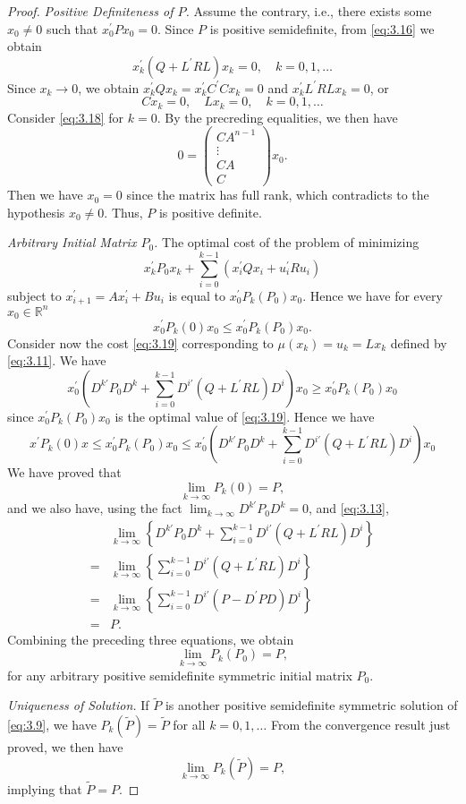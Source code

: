 \begin{proof}
\textit{Positive Definiteness of $P$.} 
Assume the contrary, i.e., there exists some $x_0\neq 0$ such that $x_0^{\prime} P x_0=0$. Since $P$ is positive semidefinite, from \cref{eq:3.16} we obtain \[x_k^\prime (Q + L^\prime R L)x_k = 0,\quad k = 0,1,\dots\]
Since $x_k\rightarrow 0$, we obtain $x_k^\prime Q x_k=x_k^\prime C^\prime C x_k=0$ and $x_k^\prime L^\prime R L x_k=0$, or
\[Cx_k = 0,\quad L x_k = 0,\quad k = 0,1,\dots\]
Consider \cref{eq:3.18} for $k=0$. By the precreding equalities, we then have 
\[0 = \begin{pmatrix}
    CA^{n - 1}\\ 
    \vdots\\ CA \\ C 
\end{pmatrix}x_0.\]
Then we have $x_0=0$ since the matrix has full rank, which contradicts to the hypothesis $x_0\neq 0$. Thus, $P$ is positive definite.

\textit{Arbitrary Initial Matrix $P_0$.} 
The optimal cost of the problem of minimizing
\begin{equation}
    x_k^\prime P_0 x_k + \sum_{i=0}^{k-1} (x_i^{\prime} Q x_i + u_i^{\prime} R u_i)\label{eq:3.19}
\end{equation}
subject to $x_{i+1}^{\prime} =A x_i^{\prime} +B u_i$ is equal to $x_0^{\prime} P_k(P_0)x_0$. Hence we have for every $x_0\in\mathbb{R}^n$
\[x_0^\prime P_k(0)x_0 \leq x_0^\prime P_k(P_0)x_0.\]
Consider now the cost \cref{eq:3.19} corresponding to $\mu(x_k)=u_k=L x_k$ defined by \cref{eq:3.11}. We have 
\[x_0^\prime \left(D^{k\prime}P_0 D^k + \sum_{i=0}^{k-1} D^{i\prime}(Q + L^\prime R L)D^i\right)x_0 \geq x_0^\prime P_k(P_0)x_0\]
since $x_0^\prime P_k(P_0)x_0$ is the optimal value of \cref{eq:3.19}.
Hence we have 
\[x^\prime P_k(0)x 
\leq x_0^\prime P_k(P_0)x_0 
\leq x_0^\prime \left(D^{k\prime}P_0 D^k + \sum_{i=0}^{k-1} D^{i\prime}(Q +
L^\prime R L)D^i\right)x_0 \]
We have proved that 
\[\lim_{k\rightarrow\infty} P_k(0) = P,\]
and we also have, using the fact $\lim_{k\rightarrow\infty} D^{k\prime}P_0 D^k=0$, and \cref{eq:3.13},
\begin{equation}
    \begin{aligned}
        &\lim_{k\rightarrow\infty} \left\{ D^{k\prime}P_0
        D^k + \sum_{i=0}^{k-1} D^{i\prime}(Q + L^\prime R L)D^i\right\}\\
        =&\lim_{k\rightarrow\infty} \left\{\sum_{i=0}^{k-1} D^{i\prime}(Q + L^\prime RL)D^i\right\}\\
        =&\lim_{k\rightarrow\infty} \left\{\sum_{i=0}^{k-1} D^{i\prime}(P - D^\prime PD)D^i\right\}\\
        =&P.
    \end{aligned}
\end{equation}
Combining the preceding three equations, we obtain
\[\lim_{k\rightarrow\infty} P_k(P_0) = P,\]
for any arbitrary positive semidefinite symmetric initial matrix $P_0$.

\textit{Uniqueness of Solution.}
If $\tilde{P}$ is another positive semidefinite symmetric solution of \cref{eq:3.9}, we have $P_k(\tilde{P})=\tilde{P}$ for all $k=0,1,\dots$ From the convergence result just proved, we then have \[\lim_{k\rightarrow\infty} P_k(\tilde{P}) = P,\] implying that $\tilde{P}=P$.
\end{proof}
